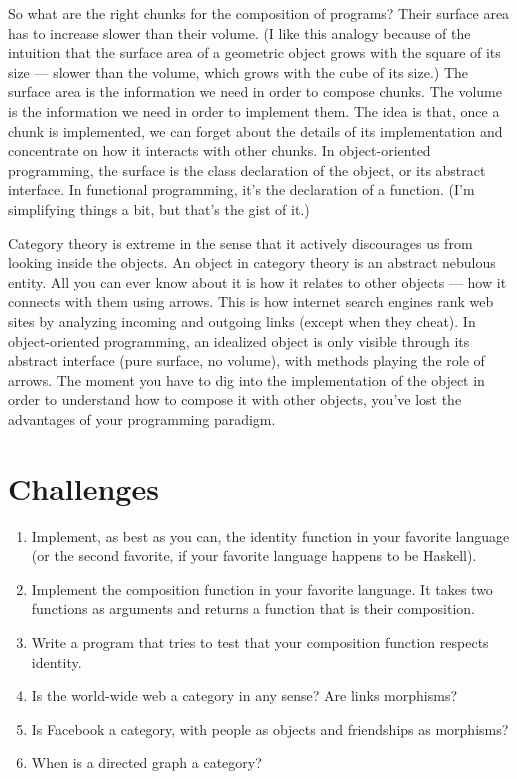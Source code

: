 So what are the right chunks for the composition of programs? Their
surface area has to increase slower than their volume. (I like this
analogy because of the intuition that the surface area of a geometric
object grows with the square of its size --- slower than the volume,
which grows with the cube of its size.) The surface area is the
information we need in order to compose chunks. The volume is the
information we need in order to implement them. The idea is that, once a
chunk is implemented, we can forget about the details of its
implementation and concentrate on how it interacts with other chunks. In
object-oriented programming, the surface is the class declaration of the
object, or its abstract interface. In functional programming, it's the
declaration of a function. (I'm simplifying things a bit, but that's the
gist of it.)

Category theory is extreme in the sense that it actively discourages us
from looking inside the objects. An object in category theory is an
abstract nebulous entity. All you can ever know about it is how it
relates to other objects --- how it connects with them using arrows. This
is how internet search engines rank web sites by analyzing incoming and
outgoing links (except when they cheat). In object-oriented programming,
an idealized object is only visible through its abstract interface (pure
surface, no volume), with methods playing the role of arrows. The moment
you have to dig into the implementation of the object in order to
understand how to compose it with other objects, you've lost the
advantages of your programming paradigm.

\section{Challenges}\label{challenges}

\begin{enumerate}
\tightlist
\item
  Implement, as best as you can, the identity function in your favorite
  language (or the second favorite, if your favorite language happens to
  be Haskell).
\item
  Implement the composition function in your favorite language. It takes
  two functions as arguments and returns a function that is their
  composition.
\item
  Write a program that tries to test that your composition function
  respects identity.
\item
  Is the world-wide web a category in any sense? Are links morphisms?
\item
  Is Facebook a category, with people as objects and friendships as
  morphisms?
\item
  When is a directed graph a category?
\end{enumerate}

